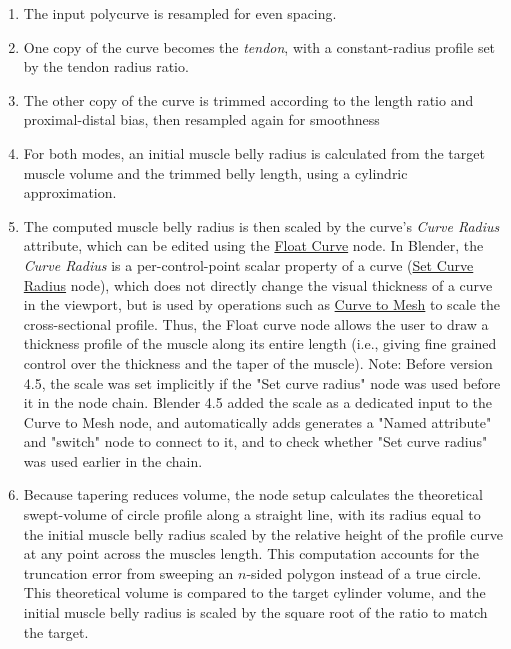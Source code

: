 \documentclass{article}
\begin{document}
\begin{enumerate}
    \item The input polycurve is resampled for even spacing.
    \item One copy of the curve becomes the \textit{tendon}, with a constant-radius profile set by the tendon radius ratio.
    \item The other copy of the curve is trimmed according to the length ratio and proximal-distal bias, then resampled again for smoothness
    \item For both modes, an initial muscle belly radius is calculated from the target muscle volume and the trimmed belly length, using a cylindric approximation.
    \item The computed muscle belly radius is then scaled by the curve's \textit{Curve Radius} attribute, which can be edited using the \href{https://docs.blender.org/manual/en/latest/compositing/types/utilities/float_curve.html}{Float Curve} node. In Blender, the \textit{Curve Radius} is a per-control-point scalar property of a curve (\href{https://docs.blender.org/manual/en/latest/modeling/geometry_nodes/curve/write/set_curve_radius.html}{Set Curve Radius} node), which does not directly change the visual thickness of a curve in the viewport, but is used by operations such as \href{https://docs.blender.org/manual/en/latest/modeling/geometry_nodes/curve/operations/curve_to_mesh.html}{Curve to Mesh} to scale the cross-sectional profile. Thus, the Float curve node allows the user to draw a thickness profile of the muscle along its entire length (i.e., giving fine grained control over the thickness and the taper of the muscle). Note: Before version 4.5, the scale was set implicitly if the "Set curve radius" node was used before it in the node chain. Blender 4.5 added the scale as a dedicated input to the Curve to Mesh node, and automatically adds generates a "Named attribute" and "switch" node to connect to it, and to check whether "Set curve radius" was used earlier in the chain.
    \item Because tapering reduces volume, the node setup calculates the theoretical swept-volume of circle profile along a straight line, with its radius equal to the initial muscle belly radius scaled by the relative height of the profile curve at any point across the muscles length. This computation accounts for the truncation error from sweeping an $n$-sided polygon instead of a true circle. This theoretical volume is compared to the target cylinder volume, and the initial muscle belly radius is scaled by the square root of the ratio to match the target.

\end{enumerate}
\end{document}

